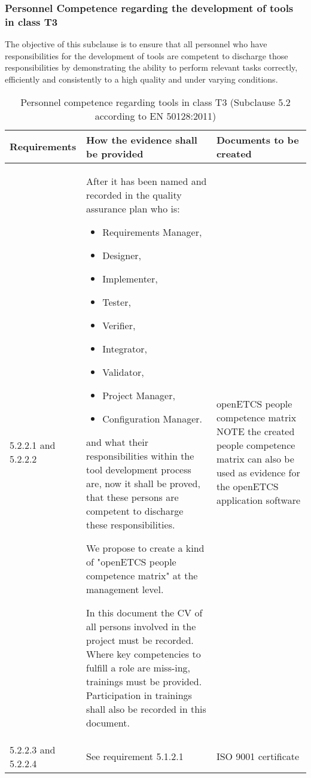 \documentclass{template/openetcs_report}
\begin{document}
\subsubsection{Personnel Competence regarding the development of tools in class T3}
\begin{flushleft}
The objective of this subclause is to ensure that all personnel who have responsibilities for the development of tools are competent to discharge those responsibilities by demonstrating the ability to perform relevant tasks correctly, efficiently and consistently to a high quality and under varying conditions.
\end{flushleft}
{\footnotesize\sffamily\centering
\begin{longtable}{|p{2cm}|p{9cm}|p{3cm}|}
\caption{Personnel competence regarding tools in class T3 (Subclause 5.2 according to EN 50128:2011)}\\
\hline
\bfseries Requirements & \bfseries How the evidence shall be provided & \bfseries Documents to be created\\
\hline
\hline
\endhead
\hline
\endfoot

5.2.2.1 and 5.2.2.2 & After it has been named and recorded in the quality assurance plan who is:
\begin{itemize}\itemsep=0pt
  \item Requirements Manager,
  \item Designer,
  \item Implementer,
  \item Tester,
  \item Verifier,
  \item Integrator,
  \item Validator,
  \item Project Manager,
  \item Configuration Manager.
\end{itemize}
and what their responsibilities within the tool development process are, now it shall be proved, that these persons are competent to discharge these responsibilities.

We propose to create a kind of "openETCS people competence matrix" at the management level. 

In this document the CV of all persons involved in the project must be recorded.
Where key competencies to fulfill a role are miss-ing, trainings must be provided.
Participation in trainings shall also be recorded in this document.
& openETCS people competence matrix
\linebreak
\linebreak
NOTE\linebreak
the created people competence matrix can also be used as evidence for the openETCS application software\\ 
\hline
5.2.2.3 and 5.2.2.4 & See requirement 5.1.2.1 & ISO 9001 certificate\\ 
\hline
\end{longtable}}
\end{document}
